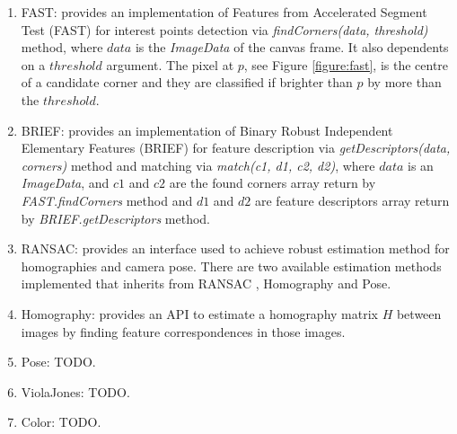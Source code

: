 \begin{enumerate}
  \item FAST: provides an implementation of Features from Accelerated Segment Test (FAST) \cite{Rosten2010} for interest points detection via \textit{findCorners(data, threshold)} method, where $data$ is the \textit{ImageData} of the canvas \cite{Canvas2013} frame. It also dependents on a $threshold$ argument. The pixel at $p$, see Figure \ref{figure:fast}, is the centre of a candidate corner and they are classified if brighter than $p$ by more than the $threshold$.
  \item BRIEF: provides an implementation of Binary Robust Independent Elementary Features (BRIEF) \cite{Calonder2010} for feature description via \textit{getDescriptors(data, corners)} method and matching via \textit{match(c1, d1, c2, d2)}, where $data$ is an \textit{ImageData}, and $c1$ and $c2$ are the found corners array return by \textit{FAST.findCorners} method and $d1$ and $d2$ are feature descriptors array return by \textit{BRIEF.getDescriptors} method.
  \item RANSAC: provides an interface used to achieve robust estimation method for homographies and camera pose. There are two available estimation methods implemented that inherits from RANSAC \cite{Hartley2004}, Homography and Pose.
  \item Homography: provides an API to estimate a homography matrix $H$ between images by finding feature correspondences in those images.
  \item Pose: TODO.
  \item ViolaJones: TODO.
  \item Color: TODO.
\end{enumerate}

